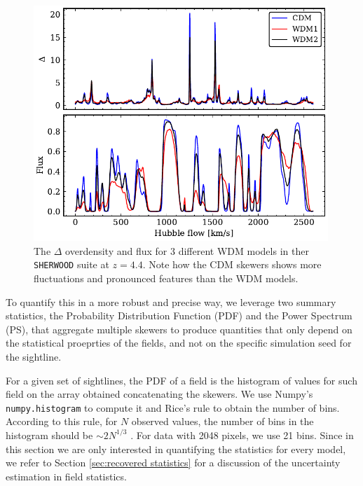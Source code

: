 \begin{figure}[ht]
        \centering
            \includegraphics[width=0.99\textwidth]{img/ML/skewer_delta_flux.pdf}
            \caption{The $\Delta$ overdensity and flux for 3 different WDM models in ther \texttt{SHERWOOD} suite at $z=4.4$. Note how the CDM skewers shows more fluctuations and pronounced features than the WDM models.}
            \label{fig: skewer delta flux}
\end{figure}
To quantify this in a more robust and precise way, we leverage two summary statistics, the Probability Distribution Function (PDF) and the Power Spectrum (PS), that aggregate multiple skewers to produce quantities that only depend on the statistical proeprties of the fields, and not on the specific simulation seed for the sightline.

For a given set of sightlines, the PDF of a field is the histogram of values for such field on the array obtained concatenating the skewers. We use Numpy's \texttt{numpy.histogram} to compute it and Rice's rule to obtain the number of bins. According to this rule, for $N$ observed values, the number of bins in the histogram should be $\sim 2N^{1/3}$ \cite{Freedman1981}. For data with 2048 pixels, we use 21 bins. Since in this section we are only interested in quantifying the statistics for every model, we refer to Section \ref{sec:recovered statistics} for a discussion of the uncertainty estimation in field statistics.


